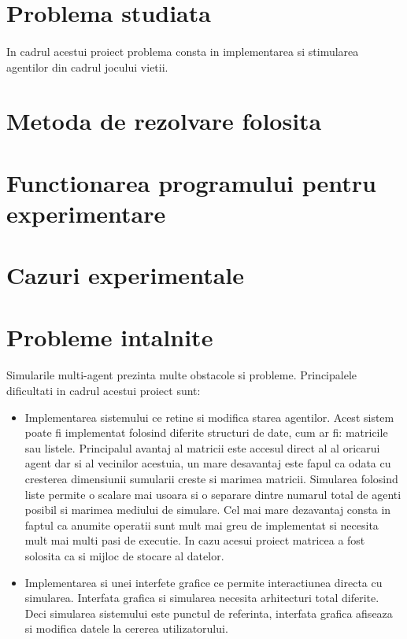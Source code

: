 \documentclass[11pt ,A4]{article}
\begin{document}
    \section{Problema studiata}
        \paragraph{} In cadrul acestui proiect problema consta in implementarea si stimularea agentilor din cadrul jocului vietii.

    \section{Metoda de rezolvare folosita}

    \section{Functionarea programului pentru experimentare}

    \section{Cazuri experimentale}

    \section{Probleme intalnite}

        \paragraph{} Simularile multi-agent prezinta multe obstacole si probleme. Principalele dificultati in cadrul acestui proiect sunt:
        \begin{itemize}
            \item Implementarea sistemului ce retine si modifica starea agentilor. Acest sistem poate fi implementat folosind diferite structuri de date, cum ar fi: matricile sau listele. Principalul avantaj al matricii este accesul direct al al oricarui agent dar si al vecinilor acestuia, un mare desavantaj este fapul ca odata cu cresterea dimensiunii sumularii creste si marimea matricii. Simularea folosind liste permite o scalare mai usoara si o separare dintre numarul total de agenti posibil si marimea mediului de simulare. Cel mai mare dezavantaj consta in faptul ca anumite operatii sunt mult mai greu de implementat si necesita mult mai multi pasi de executie. In cazu acesui proiect matricea a fost solosita ca si mijloc de stocare al datelor.

            \item Implementarea si unei interfete grafice ce permite interactiunea directa cu simularea. Interfata grafica si simularea necesita arhitecturi total diferite. Deci simularea sistemului este punctul de referinta, interfata grafica afiseaza si modifica datele la cererea utilizatorului.
        \end{itemize}
\end{document}
